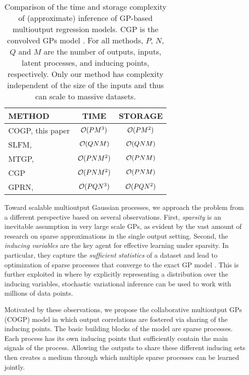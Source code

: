 \setlength{\tabcolsep}{4pt}
\begin{table}[t]
\caption{Comparison of the time and storage complexity of (approximate) inference of GP-based multioutput regression models. CGP is the convolved GPs model \citep{alvarez-lawrence-nips-08}. For all methods, $P$, $N$, $Q$ and $M$ are the number of outputs, inputs, latent processes, and inducing points, respectively. Only our method has complexity independent of the size of the inputs and thus can scale to massive datasets.}
\label{tab:complexity}
\begin{center}
\small
\begin{tabular}{lcc}
\toprule
\textbf{METHOD} & \textbf{TIME} & \textbf{STORAGE} \\ \hline
COGP, this paper  & $\mathcal{O}(PM^3)$ & $\mathcal{O}(PM^2)$ \\
SLFM, \citep{teh-et-al-aistats-05} & $\mathcal{O}(QNM)$ & $\mathcal{O}(QNM)$ \\
MTGP, \citep{bonilla-et-al-nips-08} & $\mathcal{O}(PNM^2)$ & $\mathcal{O}(PNM)$\\ 
CGP & $\mathcal{O}(PNM^2)$ & $\mathcal{O}(PNM)$ \\
GPRN, \citep{wilson-et-al-icml-12} & $\mathcal{O}(PQN^3)$ & $\mathcal{O}(PQN^2)$ \\
\bottomrule
\end{tabular}
\end{center}
\end{table}

Toward scalable multioutput Gaussian processes, we approach the problem from a different perspective based on several observations.
First, \emph{sparsity} is an inevitable assumption in very large scale GPs, as evident by the vast amount of research on sparse approximations in the single output setting. %
Second, the \emph{inducing variables} are the key agent for effective learning under sparsity.
In particular, they capture the \emph{sufficient statistics} of a dataset and lead to optimization of sparse processes that converge to the exact GP model \citep{titsias2009variational}.
This is further exploited in \cite{hensmangaussian} where by explicitly representing a distribution over the inducing variables, stochastic variational inference can be used to work with millions of data points.

Motivated by these observations, we propose the collaborative multioutput GPs (COGP) model in which output correlations are fostered via sharing of the inducing points.
The basic building blocks of the model are sparse processes.
Each process has its own inducing points that sufficiently contain the main signals of the process. 
Allowing the outputs to share these different inducing sets then creates a medium through which multiple sparse processes can be learned jointly. 

